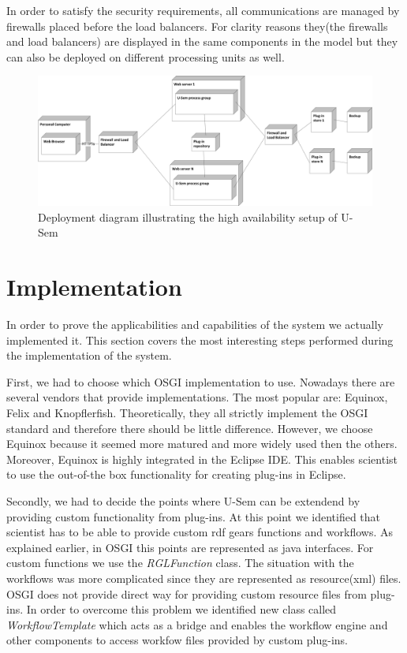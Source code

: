 In order to satisfy the security requirements, all communications are managed by firewalls placed before the load balancers. For clarity reasons they(the firewalls and load balancers) are displayed in the same components in the model but they can also be deployed on different processing units as well.


\begin{figure}[h!]
  \centering
  	\includegraphics[scale=0.70]{plug-in/layers/high_setup.png}
  \caption{Deployment diagram illustrating the high availability setup of U-Sem}
  \label{high_avail}
\end{figure}

\section{Implementation}
\label{sec:impl}

In order to prove the applicabilities and capabilities of the system we actually implemented it. This section covers the most interesting steps performed during the implementation of the system.

First, we had to choose which OSGI implementation to use. Nowadays there are several vendors that provide implementations. The most popular are: Equinox, Felix and Knopflerfish. Theoretically, they all strictly implement the OSGI standard and therefore there should be little difference. However, we choose Equinox because it seemed more matured and more widely used then the others. Moreover, Equinox is highly integrated in the Eclipse IDE. This enables scientist to use the out-of-the box functionality for creating plug-ins in Eclipse.

Secondly, we had to decide the points where U-Sem can be extendend by providing custom functionality from plug-ins. At this point we identified that scientist has to be able to provide custom rdf gears functions and workflows. As explained earlier, in OSGI this points are represented as java interfaces. For custom functions we use the \textit{RGLFunction} class. The situation with the workflows was more complicated since they are represented as resource(xml) files. OSGI does not provide direct way for providing custom resource files from plug-ins. In order to overcome this problem we identified new class called \textit{WorkflowTemplate} which acts as a bridge and enables the workflow engine and other components to access workfow files provided by custom plug-ins.


